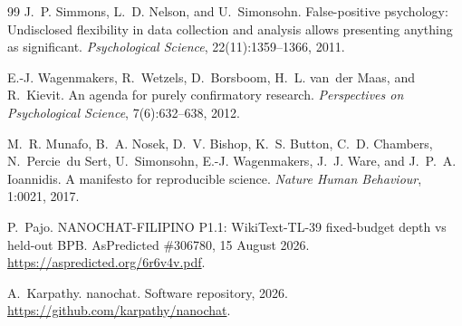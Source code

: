 \documentclass[11pt,a4paper]{article}
\begin{document}
\begin{thebibliography}{99}
J.~P. Simmons, L.~D. Nelson, and U.~Simonsohn.
\newblock False-positive psychology: Undisclosed flexibility in data collection and analysis allows presenting anything as significant.
\newblock \emph{Psychological Science}, 22(11):1359--1366, 2011.

E.-J. Wagenmakers, R.~Wetzels, D.~Borsboom, H.~L. van~der Maas, and R.~Kievit.
\newblock An agenda for purely confirmatory research.
\newblock \emph{Perspectives on Psychological Science}, 7(6):632--638, 2012.

M.~R. Munafo, B.~A. Nosek, D.~V. Bishop, K.~S. Button, C.~D. Chambers, N.~Percie~du Sert, U.~Simonsohn, E.-J. Wagenmakers, J.~J. Ware, and J.~P.~A. Ioannidis.
\newblock A manifesto for reproducible science.
\newblock \emph{Nature Human Behaviour}, 1:0021, 2017.

P.~Pajo.
\newblock NANOCHAT-FILIPINO P1.1: WikiText-TL-39 fixed-budget depth vs held-out BPB.
\newblock AsPredicted \#306780, 15 August 2026.
\newblock \url{https://aspredicted.org/6r6v4v.pdf}.

A.~Karpathy.
\newblock nanochat.
\newblock Software repository, 2026.
\newblock \url{https://github.com/karpathy/nanochat}.

\end{thebibliography}
\end{document}
